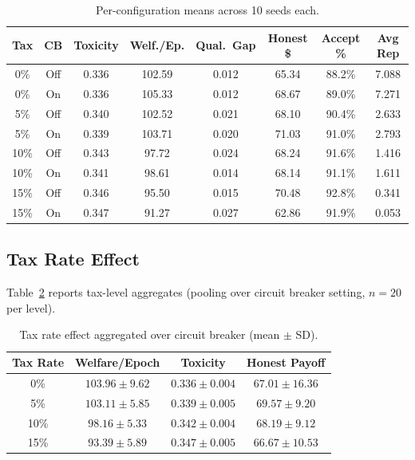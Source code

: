 \documentclass[11pt]{article}
\begin{document}
\begin{table}[H]
\centering
\caption{Per-configuration means across 10 seeds each.}
\label{tab:results}
\small
\begin{tabular}{@{}cccccccc@{}}
\toprule
Tax & CB & Toxicity & Welf./Ep. & Qual.\ Gap & Honest \$ & Accept \% & Avg Rep \\
\midrule
0\% & Off & 0.336 & 102.59 & 0.012 & 65.34 & 88.2\% & 7.088 \\
0\% & On & 0.336 & 105.33 & 0.012 & 68.67 & 89.0\% & 7.271 \\
5\% & Off & 0.340 & 102.52 & 0.021 & 68.10 & 90.4\% & 2.633 \\
5\% & On & 0.339 & 103.71 & 0.020 & 71.03 & 91.0\% & 2.793 \\
10\% & Off & 0.343 & 97.72 & 0.024 & 68.24 & 91.6\% & 1.416 \\
10\% & On & 0.341 & 98.61 & 0.014 & 68.14 & 91.1\% & 1.611 \\
15\% & Off & 0.346 & 95.50 & 0.015 & 70.48 & 92.8\% & 0.341 \\
15\% & On & 0.347 & 91.27 & 0.027 & 62.86 & 91.9\% & 0.053 \\
\bottomrule
\end{tabular}
\end{table}

\subsection{Tax Rate Effect}

Table~\ref{tab:tax} reports tax-level aggregates (pooling over circuit breaker setting, $n = 20$ per level).

\begin{table}[H]
\centering
\caption{Tax rate effect aggregated over circuit breaker (mean $\pm$ SD).}
\label{tab:tax}
\small
\begin{tabular}{@{}cccc@{}}
\toprule
Tax Rate & Welfare/Epoch & Toxicity & Honest Payoff \\
\midrule
0\% & $103.96 \pm 9.62$ & $0.336 \pm 0.004$ & $67.01 \pm 16.36$ \\
5\% & $103.11 \pm 5.85$ & $0.339 \pm 0.005$ & $69.57 \pm 9.20$ \\
10\% & $98.16 \pm 5.33$ & $0.342 \pm 0.004$ & $68.19 \pm 9.12$ \\
15\% & $93.39 \pm 5.89$ & $0.347 \pm 0.005$ & $66.67 \pm 10.53$ \\
\bottomrule
\end{tabular}
\end{table}
\end{document}
